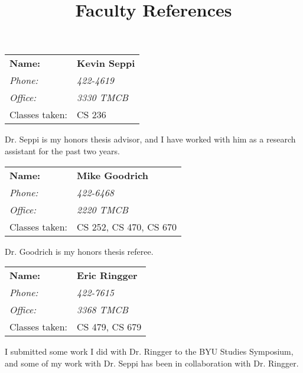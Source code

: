 \documentclass[onecolumn, 12pt]{article}
\title{Faculty References}
\author{}
\date{}
\begin{document}
\maketitle

\begin{tabular}{ll}
  \textbf{Name:}&\textbf{Kevin Seppi} \\
  \emph{Phone:}&\emph{422-4619} \\
  \emph{Office:}&\emph{3330 TMCB} \\
  Classes taken:&CS 236 \\
\end{tabular} 

Dr. Seppi is my honors thesis advisor, and I have worked with him as a research
assistant for the past two years.

\begin{tabular}{ll}
  \textbf{Name:}&\textbf{Mike Goodrich} \\
  \emph{Phone:}&\emph{422-6468} \\
  \emph{Office:}&\emph{2220 TMCB} \\
  Classes taken:&CS 252, CS 470, CS 670 \\
\end{tabular}

Dr. Goodrich is my honors thesis referee.

\begin{tabular}{ll}
  \textbf{Name:}&\textbf{Eric Ringger} \\
  \emph{Phone:}&\emph{422-7615} \\
  \emph{Office:}&\emph{3368 TMCB} \\
  Classes taken:&CS 479, CS 679 \\
\end{tabular}

I submitted some work I did with Dr. Ringger to the BYU Studies Symposium, and
some of my work with Dr. Seppi has been in collaboration with Dr. Ringger.
\end{document}
